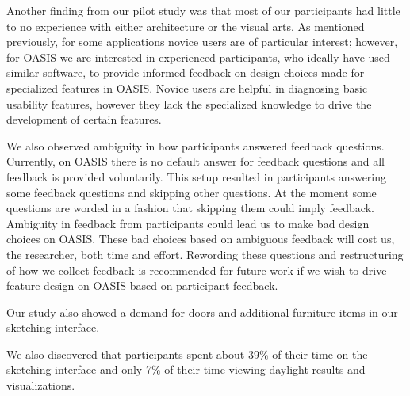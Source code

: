 	Another finding from our pilot study was that most of our participants had little to no experience with either architecture or the visual arts.	
	As mentioned previously, for some applications novice users are of particular interest; 
	however, for OASIS we are interested in experienced participants, who  ideally have used similar software, to provide informed feedback on design choices made for specialized features in OASIS.
	Novice users are helpful in diagnosing basic usability features, however they lack the specialized knowledge to drive the development of certain features.


	We also observed ambiguity in how participants answered feedback questions. 
	Currently, on OASIS there is no default answer for feedback questions and all feedback is provided voluntarily.
	This setup resulted in participants answering some feedback questions and skipping other questions.
	At the moment some questions are worded in a fashion that skipping them could imply feedback.
	Ambiguity in feedback from participants could lead us to make bad design choices on OASIS.
	These bad choices based on ambiguous feedback will cost us, the researcher, both time and effort.
	Rewording these questions and restructuring of how we collect feedback is recommended for future work if we wish to drive feature design on OASIS based on participant feedback.





	Our study also showed a demand for doors and additional furniture items in our sketching interface.

	We also discovered that participants spent about 39\% of their time on the sketching interface and only 7\% of their time viewing daylight results and visualizations.
	




